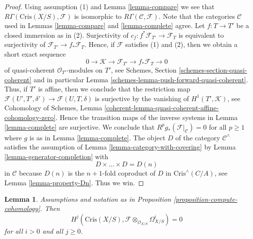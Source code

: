 \documentclass{stacks-project}
\theoremstyle{plain}
\newtheorem{lemma}[subsection]{Lemma}
\theoremstyle{definition}
\theoremstyle{remark}
\numberwithin{equation}{subsection}
\begin{document}
\begin{proof}
Using assumption (1) and Lemma \ref{lemma-compare} we see that
$R\Gamma(\text{Cris}(X/S), \mathcal{F})$ is isomorphic to
$R\Gamma(\mathcal{C}, \mathcal{F})$. Note that the categories
$\mathcal{C}$ used in Lemmas \ref{lemma-compare} and \ref{lemma-complete}
agree. Let $f : T \to T'$ be a closed immersion as in (2). Surjectivity
of $c_f : f^*\mathcal{F}_{T'} \to \mathcal{F}_T$ is equivalent to
surjectivity of $\mathcal{F}_{T'} \to f_*\mathcal{F}_T$. Hence, if
$\mathcal{F}$ satisfies (1) and (2), then we obtain a short exact sequence
$$
0 \to \mathcal{K} \to \mathcal{F}_{T'} \to f_*\mathcal{F}_T \to 0
$$
of quasi-coherent $\mathcal{O}_{T'}$-modules on $T'$, see
Schemes, Section \ref{schemes-section-quasi-coherent} and in particular
Lemma \ref{schemes-lemma-push-forward-quasi-coherent}.
Thus, if $T'$ is affine, then we conclude that the restriction map
$\mathcal{F}(U', T', \delta') \to \mathcal{F}(U, T, \delta)$
is surjective by the vanishing of $H^1(T', \mathcal{K})$, see
Cohomology of Schemes, Lemma
\ref{coherent-lemma-quasi-coherent-affine-cohomology-zero}.
Hence the transition maps of the inverse systems in Lemma \ref{lemma-complete}
are surjective. We conclude that
$R^pg_*(\mathcal{F}|_\mathcal{C}) = 0$ for all $p \geq 1$
where $g$ is as in Lemma \ref{lemma-complete}.
The object $D$ of the category $\mathcal{C}^\wedge$
satisfies the assumption of Lemma \ref{lemma-category-with-covering} by
Lemma \ref{lemma-generator-completion}
with
$$
D \times \ldots \times D = D(n)
$$
in $\mathcal{C}$ because $D(n)$ is the $n + 1$-fold coproduct of
$D$ in $\text{Cris}^\wedge(C/A)$, see Lemma \ref{lemma-property-Dn}.
Thus we win.
\end{proof}

\begin{lemma}
\label{lemma-cohomology-is-zero}
Assumptions and notation as in
Proposition \ref{proposition-compute-cohomology}.
Then
$$
H^j(\text{Cris}(X/S), \mathcal{F} \otimes_{\mathcal{O}_{X/S}} \Omega^i_{X/S})
= 0
$$
for all $i > 0$ and all $j \geq 0$.
\end{lemma}
\end{document}
